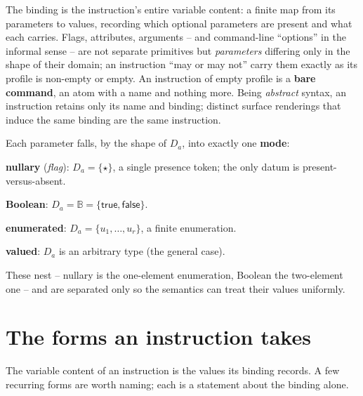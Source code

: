 \documentclass[11pt]{article}
\begin{document}
The binding is the instruction's entire variable content: a finite map from its
parameters to values, recording which optional parameters are present and what
each carries. Flags, attributes, arguments -- and command-line ``options'' in the
informal sense -- are not separate primitives but \emph{parameters} differing only
in the shape of their domain; an instruction ``may or may not'' carry them exactly
as its profile is non-empty or empty. An instruction of empty profile is a
\textbf{bare command}, an atom with a name and nothing more. Being \emph{abstract}
syntax, an instruction retains only its name and binding; distinct surface
renderings that induce the same binding are the same instruction.

Each parameter falls, by the shape of \(D_a\), into exactly one \textbf{mode}:

\begin{definitionlist}[start=5]
    \item \textbf{nullary} (\emph{flag}): \(D_a=\{\star\}\), a single presence
          token; the only datum is present-versus-absent.
    \item \textbf{Boolean}: \(D_a=\mathbb{B}=\{\mathsf{true},\mathsf{false}\}\).
    \item \textbf{enumerated}: \(D_a=\{u_1,\dots,u_r\}\), a finite enumeration.
    \item \textbf{valued}: \(D_a\) is an arbitrary type (the general case).
\end{definitionlist}

These nest -- nullary is the one-element enumeration, Boolean the two-element one
-- and are separated only so the semantics can treat their values uniformly.

\section*{The forms an instruction takes}

The variable content of an instruction is the values its binding records. A few
recurring forms are worth naming; each is a statement about the binding alone.
\end{document}
